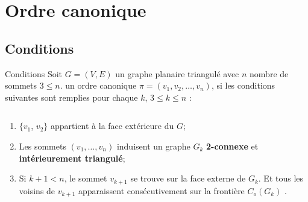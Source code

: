 \documentclass[10pt]{beamer}
\begin{document}

\section[Ordre canonique]{Ordre canonique}
\subsection{Conditions}	
{
\begin{frame}{}
	\begin{block}{Conditions}
		Soit $G = (V, E)$ un graphe planaire triangulé avec $n$ nombre de sommets $3 \le n$. 
		un ordre canonique \(\pi=(v_{1}, v_{2}, \ldots ,v_{n}) \), si les conditions suivantes sont remplies pour chaque $k$, $3 \le k \le n$ :
	\end{block}
\begin{columns}

\begin{column}{0.5\textwidth}
    \begin{minipage}{1\textwidth}
    \begin{block}{}
	  \begin{enumerate}
		\item $\{v_{1}$, $v_{2}\}$ appartient à la face extérieure du $G$; \\[.2cm]		
		\item Les sommets \( (v_1, \ldots ,v_n) \) induisent un graphe $G_{k}$ \textbf{2-connexe} et \textbf{intérieurement triangulé}; \\[.2cm]
 		\item Si \(k+1 < n\), le sommet $v_{k+1}$ se trouve sur la face externe de $G_k$. Et tous les voisins de $v_{k+1}$ apparaissent consécutivement sur la frontière $C_o(G_k)$ \citeauthor{TakaoSaidur}. 
	  \end{enumerate}
    \end{block}
    \end{minipage}
\end{column}
  

\end{columns}
\end{frame}}
\end{document}
